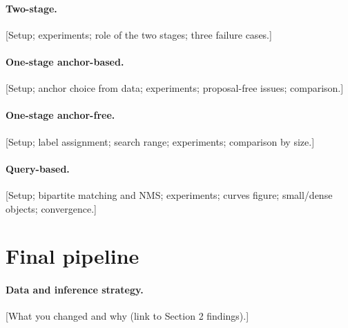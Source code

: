 \documentclass[11pt,a4paper]{article}
\begin{document}
\paragraph{Two-stage.} [Setup; experiments; role of the two stages; three failure cases.]
\paragraph{One-stage anchor-based.} [Setup; anchor choice from data; experiments; proposal-free issues; comparison.]
\paragraph{One-stage anchor-free.} [Setup; label assignment; search range; experiments; comparison by size.]
\paragraph{Query-based.} [Setup; bipartite matching and NMS; experiments; curves figure; small/dense objects; convergence.]

\section{Final pipeline}
\paragraph{Data and inference strategy.} [What you changed and why (link to Section 2 findings).]
\end{document}
